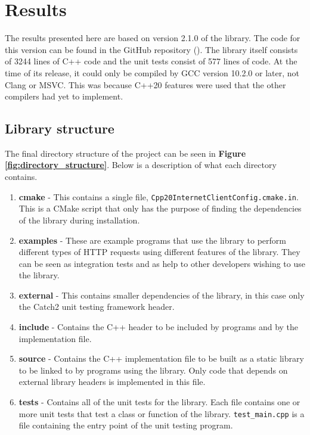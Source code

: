 \documentclass[12pt, a4paper]{article}
\begin{document}
\clearpage
\section{Results}
The results presented here are based on version 2.1.0 of the library. The code for this version can be found in the GitHub repository (\cite{Cpp20InternetClient}). The library itself consists of 3244 lines of C++ code and the unit tests consist of 577 lines of code. At the time of its release, it could only be compiled by GCC version 10.2.0 or later, not Clang or MSVC. This was because C++20 features were used that the other compilers had yet to implement.
\subsection{Library structure}
The final directory structure of the project can be seen in \textbf{Figure \ref{fig:directory_structure}}. Below is a description of what each directory contains.
\begin{enumerate}
	\item \textbf{cmake} - This contains a single file, \texttt{Cpp20InternetClientConfig.cmake.in}. This is a CMake script that only has the purpose of finding the dependencies of the library during installation.
	\item \textbf{examples} - These are example programs that use the library to perform different types of HTTP requests using different features of the library. They can be seen as integration tests and as help to other developers wishing to use the library.
	\item \textbf{external} - This contains smaller dependencies of the library, in this case only the Catch2 unit testing framework header.
	\item \textbf{include} - Contains the C++ header to be included by programs and by the implementation file.
	\item \textbf{source} - Contains the C++ implementation file to be built as a static library to be linked to by programs using the library. Only code that depends on external library headers is implemented in this file.
	\item \textbf{tests} - Contains all of the unit tests for the library. Each file contains one or more unit tests that test a class or function of the library. \texttt{test\_main.cpp} is a file containing the entry point of the unit testing program.
\end{enumerate}
\end{document}
